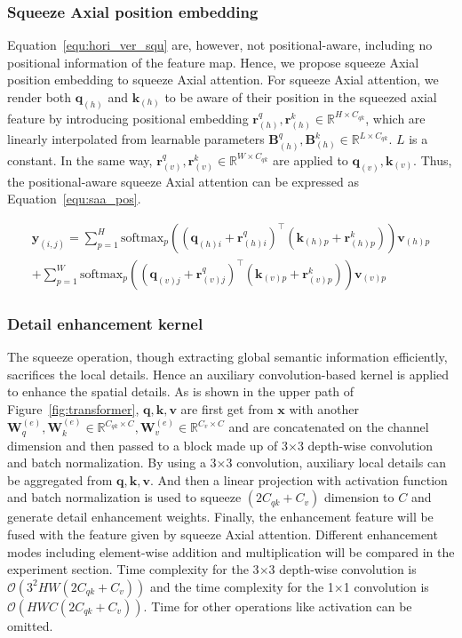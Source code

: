 \subsubsection{Squeeze Axial position embedding} Equation~\ref{equ:hori_ver_squ} are, however, not positional-aware, including no positional information of the feature map.
Hence, we propose squeeze Axial position embedding to squeeze Axial attention.
For squeeze Axial attention, we render both $\mathbf{q}_{(h)}$ and $\mathbf{k}_{(h)}$ to be aware of their position in the squeezed axial feature by introducing positional embedding $\mathbf{r}_{(h)}^{q}, \mathbf{r}_{(h)}^{k}\in \mathbb{R}^{H\times C_{qk}}$, which are linearly interpolated from learnable parameters $\mathbf{B}_{(h)}^{q}, \mathbf{B}_{(h)}^{k}\in \mathbb{R}^{L\times C_{qk}}$.
$L$ is a constant.
In the same way, $\mathbf{r}_{(v)}^q, \mathbf{r}_{(v)}^k\in \mathbb{R}^{W\times C_{qk}}$ are applied to $\mathbf{q}_{(v)}, \mathbf{k}_{(v)}$.
Thus, the positional-aware squeeze Axial attention can be expressed as Equation~\ref{equ:saa_pos}.

\begin{equation}
\begin{split}
\label{equ:saa_pos}
    \mathbf{y}_{(i,j)} = \sum_{p=1}^{H}\text{softmax}_p\left((\mathbf{q}_{(h)i} + \mathbf{r}_{(h)i}^{q})^\top (\mathbf{k}_{(h)p} + \mathbf{r}_{(h)p}^{k})\right)\mathbf{v}_{(h)p}\\
    + \sum_{p=1}^W\text{softmax}_p\left((\mathbf{q}_{(v)j} + \mathbf{r}_{(v)j}^{q})^\top (\mathbf{k}_{(v)p} + \mathbf{r}_{(v)p}^{k}) \right)\mathbf{v}_{(v)p}
\end{split}
\end{equation}


\subsubsection{Detail enhancement kernel}
The squeeze operation, though extracting global semantic information efficiently, sacrifices the local details. 
Hence an auxiliary convolution-based kernel is applied to enhance the spatial details. 
As is shown in the upper path of Figure~\ref{fig:transformer}, $\mathbf{q},\mathbf{k},\mathbf{v}$ are first get from $\mathbf{x}$ with another $\mathbf{W}_q^{(e)}, \mathbf{W}_k^{(e)}\in \mathbb{R}^{C_{qk}\times C}, \mathbf{W}_v^{(e)}\in \mathbb{R}^{C_v\times C}$ and are concatenated on the channel dimension and then passed to a block made up of 3$\times$3 depth-wise convolution and batch normalization. 
By using a 3$\times$3 convolution, auxiliary local details can be aggregated from 
$\mathbf{q},\mathbf{k},\mathbf{v}$. 
And then a linear projection with activation function and batch normalization is used to squeeze $(2C_{qk}+C_{v})$ dimension to $C$ and generate detail enhancement weights.
Finally, the enhancement feature will be fused with the feature given by squeeze Axial attention. 
Different enhancement modes including element-wise addition and multiplication will be compared in the experiment section.
Time complexity for the 3$\times$3 depth-wise convolution is $\mathcal{O}(3^2HW (2C_{qk}+C_v))$ and the time complexity for the 1$\times$1 convolution is $\mathcal{O}(HWC(2C_{qk}+C_{v}))$. 
Time for other operations like activation can be omitted.

